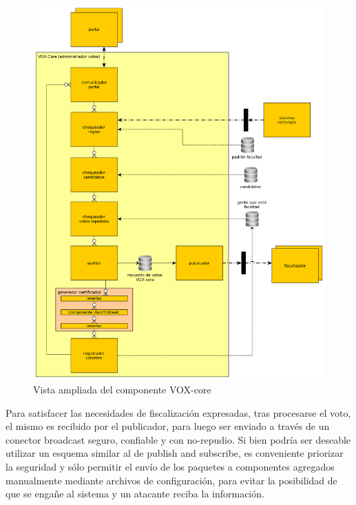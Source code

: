 \begin{figure}[H]
	\begin{center}
		\includegraphics[scale=0.26]{../diagramas/voxcore.png}
	\end{center}
	\caption{Vista ampliada del componente VOX-core}	
	\label{fig:voxcore}
\end{figure} 
 
Para satisfacer las necesidades de fiscalización expresadas, tras procesarse el voto, el mismo es recibido por el publicador, 
para luego ser enviado a través de un conector broadcast seguro, confiable y con no-repudio. Si bien podría ser deseable utilizar un esquema similar al de publish and subscribe, es conveniente priorizar la seguridad y sólo permitir el envío de los paquetes a componentes agregados manualmente mediante archivos de configuración, para evitar la posibilidad de que se engañe al sistema y un atacante reciba la información.

